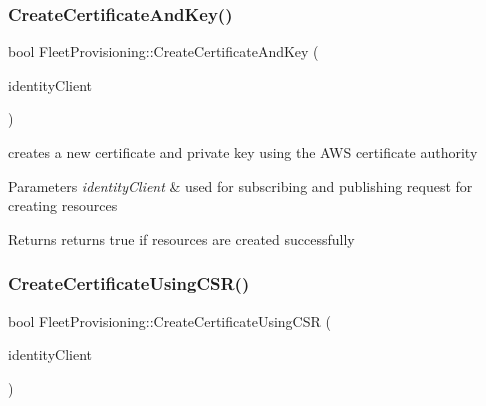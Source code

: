 \subsubsection{\texorpdfstring{Create\+Certificate\+And\+Key()}{CreateCertificateAndKey()}}
{\footnotesize\ttfamily bool Fleet\+Provisioning\+::\+Create\+Certificate\+And\+Key (\begin{DoxyParamCaption}\item[{Iotidentity\+::\+Iot\+Identity\+Client}]{identity\+Client }\end{DoxyParamCaption})\hspace{0.3cm}{\ttfamily [private]}}



creates a new certificate and private key using the A\+WS certificate authority 


\begin{DoxyParams}{Parameters}
{\em identity\+Client} & used for subscribing and publishing request for creating resources \\
\hline
\end{DoxyParams}
\begin{DoxyReturn}{Returns}
returns true if resources are created successfully 
\end{DoxyReturn}
\mbox{\label{class_aws_1_1_iot_1_1_device_client_1_1_fleet_provisioning_a2044a0b21798463dff066fabbb9ad869}} 
\subsubsection{\texorpdfstring{Create\+Certificate\+Using\+C\+S\+R()}{CreateCertificateUsingCSR()}}
{\footnotesize\ttfamily bool Fleet\+Provisioning\+::\+Create\+Certificate\+Using\+C\+SR (\begin{DoxyParamCaption}\item[{Iotidentity\+::\+Iot\+Identity\+Client}]{identity\+Client }\end{DoxyParamCaption})\hspace{0.3cm}{\ttfamily [private]}}



